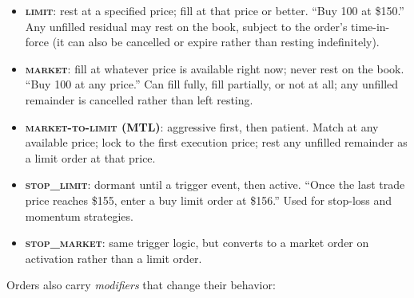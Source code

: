 \documentclass[11pt,a4paper]{article}
\begin{document}
\begin{itemize}[nosep]
\item \textbf{\textsc{limit}}: rest at a specified price; fill at that
      price or better. ``Buy 100 at \$150.'' Any unfilled residual may
      rest on the book, subject to the order's time-in-force (it can
      also be cancelled or expire rather than resting indefinitely).

\item \textbf{\textsc{market}}: fill at whatever price is available
      right now; never rest on the book. ``Buy 100 at any price.'' Can
      fill fully, fill partially, or not at all; any unfilled remainder
      is cancelled rather than left resting.

\item \textbf{\textsc{market-to-limit} (MTL)}: aggressive first, then
      patient. Match at any available price; lock to the first execution
      price; rest any unfilled remainder as a limit order at that price.

\item \textbf{\textsc{stop\_limit}}: dormant until a trigger event,
      then active. ``Once the last trade price reaches \$155, enter a
      buy limit order at \$156.'' Used for stop-loss and momentum
      strategies.

\item \textbf{\textsc{stop\_market}}: same trigger logic, but converts
      to a market order on activation rather than a limit order.
\end{itemize}

Orders also carry \emph{modifiers} that change their behavior:
\end{document}
